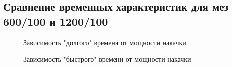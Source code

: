 \documentclass[a4paper,12pt]{article}
\begin{document}
	\subsection{Сравнение временных характеристик для мез 600/100 и 1200/100}
		\begin{figure}[H]
			\caption{Зависимость "долгого" времени от мощности накачки}
		\end{figure}
		\begin{figure}[H]
			\caption{Зависимость "быстрого" времени от мощности накачки}
		\end{figure}
\end{document}
